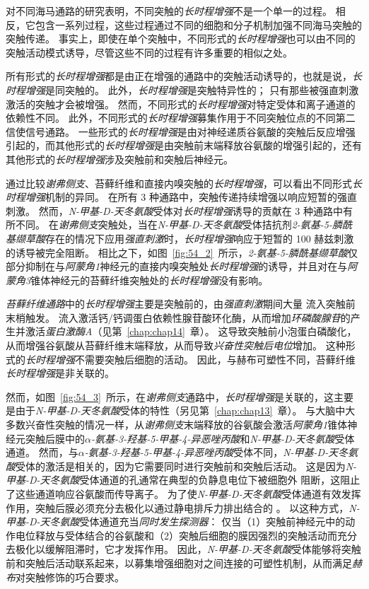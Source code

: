 对不同海马通路的研究表明，不同突触的\textit{长时程增强}不是一个单一的过程。
相反，它包含一系列过程，这些过程通过不同的细胞和分子机制加强不同海马突触的突触传递。
事实上，即使在单个突触中，不同形式的\textit{长时程增强}也可以由不同的突触活动模式诱导，尽管这些不同的过程有许多重要的相似之处。


所有形式的\textit{长时程增强}都是由正在增强的通路中的突触活动诱导的，也就是说，\textit{长时程增强}是同突触的。
此外，\textit{长时程增强}是突触特异性的；
只有那些被强直刺激激活的突触才会被增强。
然而，不同形式的\textit{长时程增强}对特定受体和离子通道的依赖性不同。
此外，不同形式的\textit{长时程增强}募集作用于不同突触位点的不同第二信使信号通路。
一些形式的\textit{长时程增强}是由对神经递质谷氨酸的突触后反应增强引起的，而其他形式的\textit{长时程增强}是由突触前末端释放谷氨酸的增强引起的，还有其他形式的\textit{长时程增强}涉及突触前和突触后神经元。


通过比较\textit{谢弗侧支}、苔藓纤维和直接内嗅突触的\textit{长时程增强}，可以看出不同形式\textit{长时程增强}机制的异同。
在所有 3 种通路中，突触传递持续增强以响应短暂的强直刺激。
然而，\textit{N-甲基-D-天冬氨酸}受体对\textit{长时程增强}诱导的贡献在 3 种通路中有所不同。
在\textit{谢弗侧支}突触处，当在\textit{N-甲基-D-天冬氨酸}受体拮抗剂\textit{2-氨基-5-膦酰基缬草酸}存在的情况下应用\textit{强直刺激}时，\textit{长时程增强}响应于短暂的 100 赫兹刺激的诱导被完全阻断。
相比之下，如图~\ref{fig:54_2}~所示，\textit{2-氨基-5-膦酰基缬草酸}仅部分抑制在与\textit{阿蒙角1}神经元的直接内嗅突触处\textit{长时程增强}的诱导，并且对在与\textit{阿蒙角3}锥体神经元的苔藓纤维突触处的\textit{长时程增强}没有影响。


\textit{苔藓纤维通路}中的\textit{长时程增强}主要是突触前的，由\textit{强直刺激}期间大量  流入突触前末梢触发。
 流入激活钙/钙调蛋白依赖性腺苷酸环化酶，从而增加\textit{环磷酸腺苷}的产生并激活\textit{蛋白激酶A}（见第~\ref{chap:chap14}~章）。
这导致突触前小泡蛋白磷酸化，从而增强谷氨酸从苔藓纤维末端释放，从而导致\textit{兴奋性突触后电位}增加。
这种形式的\textit{长时程增强}不需要突触后细胞的活动。
因此，与赫布可塑性不同，苔藓纤维\textit{长时程增强}是非关联的。


然而，如图~\ref{fig:54_3}~所示，在\textit{谢弗侧支}通路中，\textit{长时程增强}是关联的，这主要是由于\textit{N-甲基-D-天冬氨酸}受体的特性（另见第~\ref{chap:chap13}~章）。
与大脑中大多数兴奋性突触的情况一样，从\textit{谢弗侧支}末端释放的谷氨酸会激活\textit{阿蒙角1}锥体神经元突触后膜中的\textit{$\alpha$-氨基-3-羟基-5-甲基-4-异恶唑丙酸}和\textit{N-甲基-D-天冬氨酸}受体通道。
然而，与\textit{$\alpha$-氨基-3-羟基-5-甲基-4-异恶唑丙酸}受体不同，\textit{N-甲基-D-天冬氨酸}受体的激活是相关的，因为它需要同时进行突触前和突触后活动。
这是因为\textit{N-甲基-D-天冬氨酸}受体通道的孔通常在典型的负静息电位下被细胞外  阻断，这阻止了这些通道响应谷氨酸而传导离子。
为了使\textit{N-甲基-D-天冬氨酸}受体通道有效发挥作用，突触后膜必须充分去极化以通过静电排斥力排出结合的 。
以这种方式，\textit{N-甲基-D-天冬氨酸}受体通道充当\textit{同时发生探测器}：
仅当（1）突触前神经元中的动作电位释放与受体结合的谷氨酸和（2）突触后细胞的膜因强烈的突触活动而充分去极化以缓解阻滞时，它才发挥作用。
因此，\textit{N-甲基-D-天冬氨酸}受体能够将突触前和突触后活动联系起来，以募集增强细胞对之间连接的可塑性机制，从而满足\textit{赫布}对突触修饰的巧合要求。


